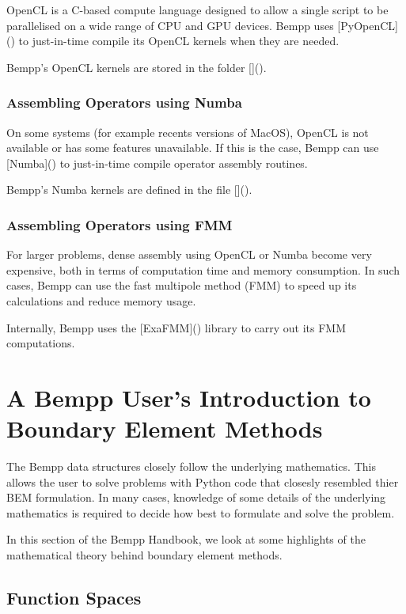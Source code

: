 \documentclass[a4paper]{book}
\begin{document}
OpenCL is a C-based compute language designed to allow a single script to be parallelised on
a wide range of CPU and GPU devices. Bempp uses [PyOpenCL]()
to just-in-time compile its OpenCL kernels when they are needed.

Bempp's OpenCL kernels are stored in the folder []().


\section{Assembling Operators using Numba}

On some systems (for example recents versions of MacOS), OpenCL is not available or has some features
unavailable. If this is the case, Bempp can use [Numba]()
to just-in-time compile operator assembly routines.

Bempp's Numba kernels are defined in the file []().


\section{Assembling Operators using FMM}

For larger problems, dense assembly using OpenCL or Numba become very expensive, both in terms of
computation time and memory consumption. In such cases, Bempp can use the fast multipole method (FMM)
to speed up its calculations and reduce memory usage.

Internally, Bempp uses the [ExaFMM]() library to carry out its FMM computations.


\part{A Bempp User's Introduction to Boundary Element Methods}


The Bempp data structures closely follow the underlying mathematics.
This allows the user to solve problems with Python code that closesly resembled thier
BEM formulation. In many cases, knowledge of some details of the underlying mathematics
is required to decide how best to formulate and solve the problem.

In this section of the Bempp Handbook, we look at some highlights of the mathematical theory
behind boundary element methods.


\chapter{Function Spaces}
\end{document}
